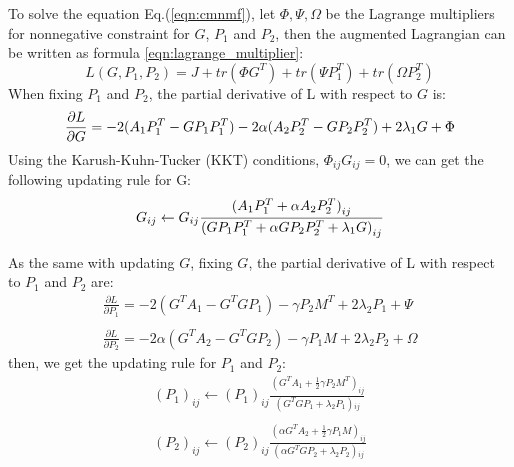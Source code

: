 \documentclass{bmcart}
\begin{document}
To solve the equation Eq.(\ref{eqn:cmnmf}), let $\Phi ,\Psi ,\Omega $ be the Lagrange multipliers for nonnegative constraint for $G$, $P_1$ and $P_2$, then the augmented Lagrangian can be written as formula \ref{eqn:lagrange_multiplier}:
\begin{equation}
    \label{eqn:lagrange_multiplier}
    {L(G,{P_1},{P_2})}= J + tr({\Phi}{G^T}) + tr({\Psi}P_1^T) + tr({\Omega}P_2^T)
\end{equation}
When fixing $P_1$ and $P_2$, the partial derivative of L with respect to $G$ is:
\begin{equation}
\label{eqn:derivation}
\frac{{\partial L}}{{\partial G}} =  - 2({A_1}P_1^T - G{P_1}P_1^T) - 2\alpha ({A_2}P_2^T - G{P_2}P_2^T) + 2{\lambda _1}G + \Phi \\\\
\end{equation}
Using the Karush-Kuhn-Tucker (KKT) conditions, $\Phi_{ij}{G_{ij}} = 0$, we can get the following updating rule for G:
\begin{equation}
\label{eqn:update_G}
{G_{ij}} \leftarrow {G_{ij}}\frac{{{{({A_1}P_1^T + \alpha {A_2}P_2^T)}_{ij}}}}{{{{(G{P_1}P_1^T + \alpha G{P_2}P_2^T + {\lambda _1}G)}_{ij}}}}\\\\
\end{equation}

As the same with updating $G$, fixing $G$, the partial derivative of L with respect to $P_1$ and $P_2$ are:
\begin{equation}
\begin{array}{l}
\frac{{\partial L}}{{\partial {P_1}}} =  - 2({G^T}{A_1} - {G^T}G{P_1}) - \gamma {P_2}{M^T} + 2{\lambda _2}{P_1} + \Psi \\\\
\frac{{\partial L}}{{\partial {P_2}}} =  - 2\alpha ({G^T}{A_2} - {G^T}G{P_2}) - \gamma {P_1}M + 2{\lambda _2}{P_2} + \Omega
\end{array}
\end{equation}
then, we get the updating rule for $P_1$ and $P_2$:
\begin{equation}
\begin{array}{l}
(P_1)_{ij} \leftarrow (P_1)_{ij}\frac{{{{({G^T}{A_1} + \frac{1}{2}\gamma {P_2}{M^T})}_{ij}}}}{{({G^T}G{P_1} + {\lambda _2}{P_1}){}_{ij}}}\\\\
(P_2)_{ij} \leftarrow (P_2)_{ij}\frac{{{{(\alpha {G^T}{A_2} + \frac{1}{2}\gamma {P_1}M)}_{ij}}}}{{(\alpha {G^T}G{P_2} + {\lambda _2}{P_2}){}_{ij}}}
\end{array}
\end{equation}
\end{document}
